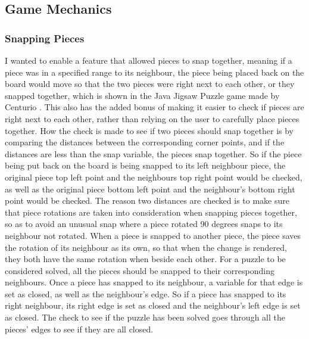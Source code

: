 \documentclass{article}
\begin{document}
\subsection{Game Mechanics}

\subsubsection{Snapping Pieces}
I wanted to enable a feature that allowed pieces to snap together, meaning if a
piece was in a specified range to its neighbour, the piece being placed back on
the board would move so that the two pieces were right next to each other, or
they snapped together, which is shown in the Java Jigsaw Puzzle game made by
Centurio \cite{ref:SourceJigsaw}. This also has the added bonus of making it
easier to check if pieces are right next to each other, rather than relying on
the user to carefully place pieces together. How the check is made to see if two
pieces should snap together is by comparing the distances between the
corresponding corner points, and if the distances are less than the snap
variable, the pieces snap together. So if the piece being put back on the board
is being snapped to its left neighbour piece, the original piece top left point
and the neighbours top right point would be checked, as well as the original
piece bottom left point and the neighbour's bottom right point would be
checked. The reason two distances are checked is to make sure that piece
rotations are taken into consideration when snapping pieces together, so as to
avoid an unusual snap where a piece rotated 90 degrees snaps to its neighbour
not rotated. When a piece is snapped to another piece, the piece saves the
rotation of its neighbour as its own, so that when the change is rendered, they
both have the same rotation when beside each other. For a puzzle to be
considered solved, all the pieces should be snapped to their corresponding
neighbours. Once a piece has snapped to its neighbour, a variable for that edge
is set as closed, as well as the neighbour's edge. So if a piece has snapped to
its right neighbour, its right edge is set as closed and the neighbour's left
edge is set as closed. The check to see if the puzzle has been solved goes
through all the pieces' edges to see if they are all closed.

\end{document}
